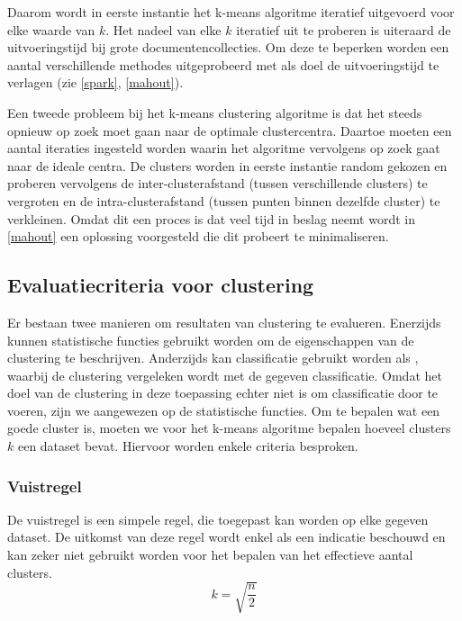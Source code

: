 Daarom wordt in eerste instantie het k-means algoritme iteratief uitgevoerd voor elke waarde van $k$. Het nadeel van elke $k$ iteratief uit te proberen is uiteraard de uitvoeringstijd bij grote documentencollecties. Om deze te beperken worden een aantal verschillende methodes uitgeprobeerd met als doel de uitvoeringstijd te verlagen (zie \ref{spark}, \ref{mahout}). 

Een tweede probleem bij het k-means clustering algoritme is dat het steeds opnieuw op zoek moet gaan naar de optimale clustercentra. Daartoe moeten een aantal iteraties ingesteld worden waarin het algoritme vervolgens op zoek gaat naar de ideale centra. De clusters worden in eerste instantie random gekozen en proberen vervolgens de inter-clusterafstand (tussen verschillende clusters) te vergroten en de intra-clusterafstand (tussen punten binnen dezelfde cluster) te verkleinen. Omdat dit een proces is dat veel tijd in beslag neemt wordt in \ref{mahout} een oplossing voorgesteld die dit probeert te minimaliseren. 

\subsection{Evaluatiecriteria voor clustering}\label{evaluatie-clustering}
Er bestaan twee manieren om resultaten van clustering te evalueren. Enerzijds kunnen statistische functies gebruikt worden om de eigenschappen van de clustering te beschrijven. Anderzijds kan classificatie gebruikt worden als , waarbij de clustering vergeleken wordt met de gegeven classificatie. Omdat het doel van de clustering in deze toepassing echter niet is om classificatie door te voeren, zijn we aangewezen op de statistische functies. Om te bepalen wat een goede cluster is, moeten we voor het k-means algoritme bepalen hoeveel clusters $k$ een dataset bevat. Hiervoor worden enkele criteria besproken.

\subsubsection{Vuistregel}
De vuistregel \cite{Science2013} is een simpele regel, die toegepast kan worden op elke gegeven dataset. De uitkomst van deze regel wordt enkel als een indicatie beschouwd en kan zeker niet gebruikt worden voor het bepalen van het effectieve aantal clusters. 
\begin{equation}
k = \sqrt{\frac{n}{2}}
\end{equation}

